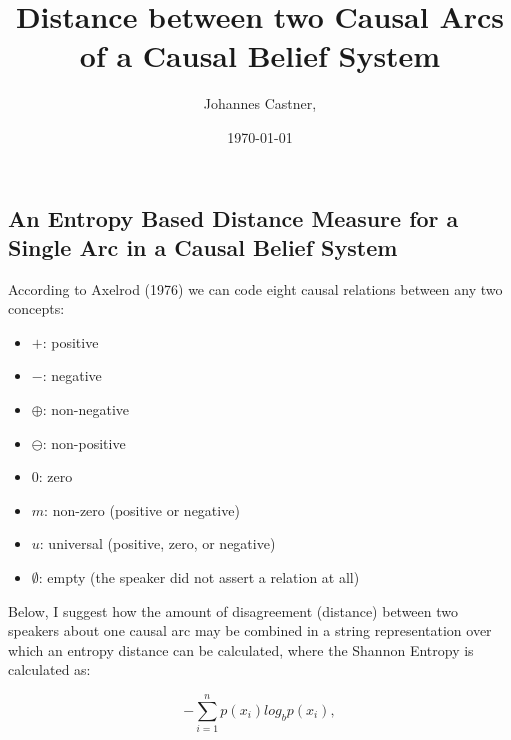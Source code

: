\documentclass[12pt]{article}
\begin{document}
%

\title{Distance between two Causal Arcs of a Causal Belief System}			%
\author{Johannes  Castner, }		%
\date \today	
\maketitle
  

\subsection{An Entropy Based Distance Measure for a Single Arc in a Causal Belief System}

According to Axelrod (1976) we can code eight causal relations between any two concepts:

\begin{itemize}
\item $+$: positive
\item $-$: negative
\item $\oplus$: non-negative
\item $\ominus$: non-positive
\item $0$: zero
\item $m$: non-zero (positive or negative)
\item $u$: universal (positive, zero, or negative)
\item $\emptyset$: empty (the speaker did not assert a relation at all)
\end{itemize} 

Below, I suggest how the amount of disagreement (distance) between two speakers about one causal arc may be combined in a string representation over which an entropy distance can be calculated, where the Shannon Entropy is calculated as:

$$-\sum_{i=1}^n p(x_i)log_b p(x_i),$$
\end{document}
